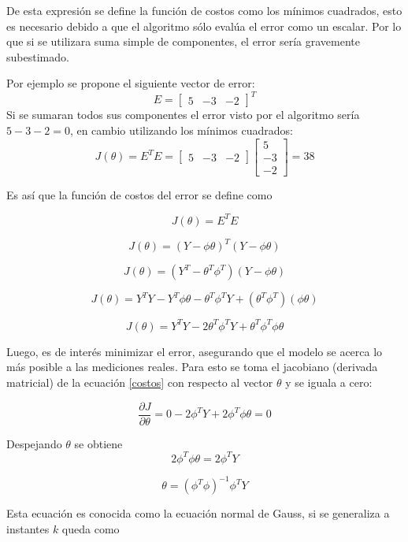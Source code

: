 De esta expresión se define la función de costos como los mínimos cuadrados, esto es necesario debido a que el algoritmo sólo evalúa el error como un escalar. Por lo que si se utilizara suma simple de componentes, el error sería gravemente subestimado.

Por ejemplo se propone el siguiente vector de error:
\[
  E = \begin{bmatrix} 5 & -3 & -2 \end{bmatrix}^T
\]
Si se sumaran todos sus componentes el error visto por el algoritmo sería $5 - 3 - 2 = 0$, en cambio utilizando los mínimos cuadrados:
\[
  J(\theta) = E^T E = \begin{bmatrix} 5 & -3 & -2 \end{bmatrix} \begin{bmatrix} 5 \\ -3 \\ -2 \end{bmatrix} = 38
\]

Es así que la función de costos del error se define como

\[
  J(\theta) = E^T E
\]


\[
  J(\theta) = (Y - \phi \theta)^T (Y - \phi \theta)
\]

\[
  J(\theta) = (Y^T - \theta^T \phi^T) (Y - \phi \theta)
\]

\[
  J(\theta) = Y^TY - Y^T\phi\theta - \theta^T \phi^T Y + (\theta^T \phi^T)(\phi \theta)
\]

\begin{equation}
  J(\theta) = Y^TY - 2\theta^T\phi^TY + \theta^T \phi^T \phi \theta
  \label{costos}
\end{equation}

Luego, es de interés minimizar el error, asegurando que el modelo se acerca lo más posible a las mediciones reales. Para esto se toma el jacobiano (derivada matricial) de la ecuación \ref{costos} con respecto al vector $\theta$ y se iguala a cero:

\[
  \frac{\partial J}{\partial \theta} = 0 - 2\phi^TY + 2\phi^T\phi\theta = 0
\]

Despejando $\theta$ se obtiene
\[
  2\phi^T\phi\theta = 2\phi^TY
\]

\begin{equation}
  \theta = (\phi^T\phi)^{-1}\phi^TY
  \label{gaussnormal}
\end{equation}

Esta ecuación es conocida como la ecuación normal de Gauss, si se generaliza a instantes $k$ queda como

